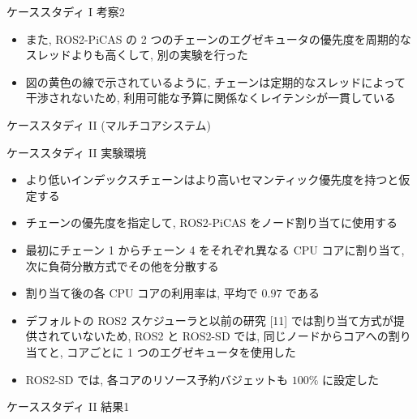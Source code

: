 \begin{frame}{ケーススタディ I 考察2}
    \begin{itemize}
        \item また, ROS2-PiCAS の 2 つのチェーンのエグゼキュータの優先度を周期的なスレッドよりも高くして, 別の実験を行った
        \item 図の黄色の線で示されているように, チェーンは定期的なスレッドによって干渉されないため, 利用可能な予算に関係なくレイテンシが一貫している
    \end{itemize}
\end{frame}

\begin{frame}{ケーススタディ II (マルチコアシステム)}
\end{frame}

\begin{frame}{ケーススタディ II 実験環境}
    \begin{itemize}
        \item より低いインデックスチェーンはより高いセマンティック優先度を持つと仮定する
        \item チェーンの優先度を指定して, ROS2-PiCAS をノード割り当てに使用する
        \item 最初にチェーン 1 からチェーン 4 をそれぞれ異なる CPU コアに割り当て, 次に負荷分散方式でその他を分散する
        \item 割り当て後の各 CPU コアの利用率は, 平均で $0.97$ である
        \item デフォルトの ROS2 スケジューラと以前の研究 [11] では割り当て方式が提供されていないため, ROS2 と ROS2-SD では, 同じノードからコアへの割り当てと, コアごとに 1 つのエグゼキュータを使用した
        \item ROS2-SD では, 各コアのリソース予約バジェットも $100 \%$ に設定した
    \end{itemize}
\end{frame}

\begin{frame}{ケーススタディ II 結果1}
\end{frame}


